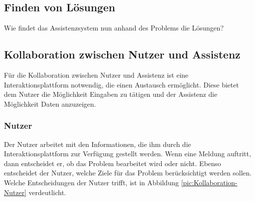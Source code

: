 \subsection{Finden von Lösungen}
Wie findet das Assistenzsystem nun anhand des Problems die Lösungen? 

\subsection{Kollaboration zwischen Nutzer und Assistenz}
Für die Kollaboration zwischen Nutzer und Assistenz ist eine Interaktionsplattform notwendig, die einen Austausch ermöglicht. Diese bietet dem Nutzer die Möglichkeit Eingaben zu tätigen und der Assistenz die Möglichkeit Daten anzuzeigen.

\subsubsection*{Nutzer}
Der Nutzer arbeitet mit den Informationen, die ihm durch die Interaktionsplattform zur Verfügung gestellt werden. Wenn eine Meldung auftritt, dann entscheidet er, ob das Problem bearbeitet wird oder nicht. Ebenso entscheidet der Nutzer, welche Ziele für das Problem berücksichtigt werden sollen. Welche Entscheidungen der Nutzer trifft, ist in Abbildung \ref{pic:Kollaboration-Nutzer} verdeutlicht.
